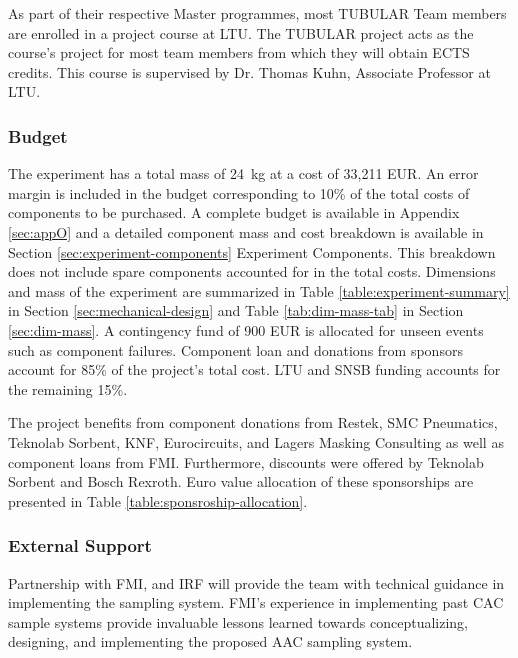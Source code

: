 As part of their respective Master programmes, most TUBULAR Team members are enrolled in a project course at LTU. The TUBULAR project acts as the course's project for most team members from which they will obtain ECTS credits. This course is supervised by Dr. Thomas Kuhn, Associate Professor at LTU.

\pagebreak
\subsubsection{Budget}
\label{sec:3.2.2}
The experiment has a total mass of \SI{24}{\kilo\gram} at a cost of 33,211 EUR. An error margin is included in the budget corresponding to 10\% of the total costs of components to be purchased. A complete budget is available in Appendix \ref{sec:appO} and a detailed component mass and cost breakdown is available in Section \ref{sec:experiment-components} Experiment Components. This breakdown does not include spare components accounted for in the total costs. Dimensions and mass of the experiment are summarized in Table \ref{table:experiment-summary} in Section \ref{sec:mechanical-design} and Table \ref{tab:dim-mass-tab} in Section \ref{sec:dim-mass}. A contingency fund of 900 EUR is allocated for unseen events such as component failures. Component loan and donations from sponsors account for 85\% of the project's total cost. LTU and SNSB funding accounts for the remaining 15\%. 

%

The project benefits from component donations from Restek, SMC Pneumatics, Teknolab Sorbent, KNF, Eurocircuits, and Lagers Masking Consulting as well as component loans from FMI. Furthermore, discounts were offered by Teknolab Sorbent and Bosch Rexroth. Euro value allocation of these sponsorships are presented in Table \ref{table:sponsroship-allocation}.




\subsubsection{External Support}

Partnership with FMI, and IRF will provide the team with technical guidance in implementing the sampling system. FMI’s experience in implementing past CAC sample systems provide invaluable lessons learned towards conceptualizing, designing, and implementing the proposed AAC sampling system.

